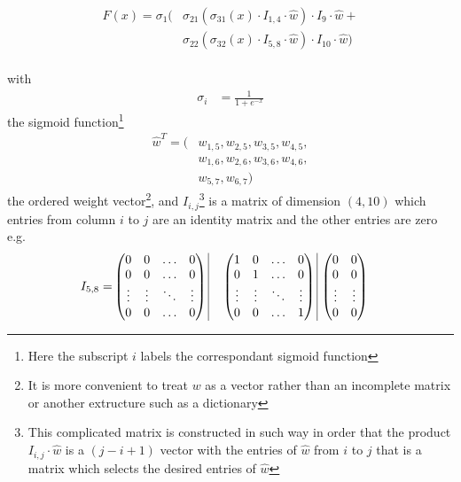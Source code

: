\documentclass[a4paper,10pt,twocolumn]{article}
\begin{document}
\begin{equation}
\begin{aligned}\label{eq1}
F(x) = \sigma_1(&\sigma_{21}(\sigma_{31}(x)\cdot I_{1,4} \cdot \hat{w} )\cdot I_{9} \cdot \hat{w}+\\
&\sigma_{22}(\sigma_{32}(x)\cdot I_{5,8} \cdot \hat{w} )\cdot I_{10} \cdot \hat{w})\\
\end{aligned}
\end{equation}

with 
\begin{equation}
\begin{aligned}
\sigma_i&=\frac{1}{1+e^{-x}}
\end{aligned}
\end{equation}
the sigmoid function\footnote{Here the subscript $i$ labels the correspondant sigmoid function}
\begin{equation}
\begin{aligned}
\hat{w}^T = (&w_{1,5},w_{2,5},w_{3,5},w_{4,5},\\
&w_{1,6},w_{2,6},w_{3,6},w_{4,6},\\
&w_{5,7},w_{6,7})
\end{aligned}
\end{equation}
the ordered weight vector\footnote{It is more convenient to treat $w$ as a vector rather than an incomplete matrix or another extructure such as a dictionary}, and 
$I_{i,j}$\footnote{This complicated matrix is constructed in such way in order that the product $I_{i,j}\cdot\hat{w} $ is a $(j-i+1)$ vector with the entries of $\hat{w}$ from $i$ to $j$ that is a matrix which selects the desired entries of $\hat{w}$} is a matrix of dimension $(4,10)$ which entries from column $i$ to  $j$ are an identity matrix and the other entries are zero e.g. 
\begin{equation}
\begin{aligned}
I_{5,8} = 
&\left(\begin{matrix}
0 &  0  & \ldots & 0\\
0  &  0 & \ldots & 0\\
\vdots & \vdots & \ddots & \vdots\\
0  &   0       &\ldots & 0
\end{matrix} \right)\, \vline \, 
&\left(\begin{matrix}
1&  0  & \ldots & 0\\
0  &  1 & \ldots & 0\\
\vdots & \vdots & \ddots & \vdots\\
0  &   0       &\ldots & 1
\end{matrix}\right)
\, \vline \,
&\left(\begin{matrix}
0 &  0  \\
0  &  0 \\
\vdots & \vdots \\
0  &   0 
\end{matrix} \right)
\end{aligned}
\end{equation}
\end{document}
